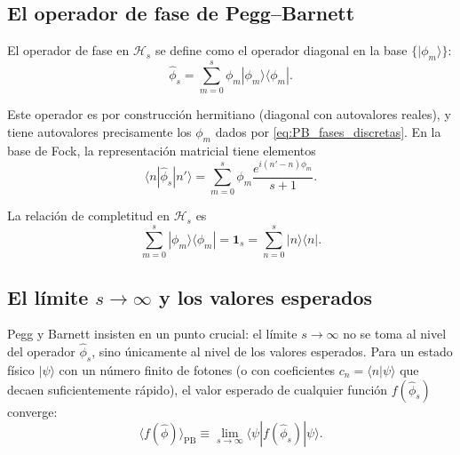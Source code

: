         \subsection{El operador de fase de Pegg--Barnett}
        
            El operador de fase en $\mathcal{H}_s$ se define como el operador diagonal en la base $\{|\phi_m\rangle\}$:
            \begin{equation}
                \hat{\phi}_s = \sum_{m=0}^{s} \phi_m |\phi_m\rangle\langle\phi_m|.
                \label{eq:PB_operador}
            \end{equation}
            
            Este operador es por construcción hermitiano (diagonal con autovalores reales), y tiene autovalores precisamente los $\phi_m$ dados por \eqref{eq:PB_fases_discretas}. En la base de Fock, la representación matricial tiene elementos
            \begin{equation}
                \langle n|\hat{\phi}_s|n'\rangle = \sum_{m=0}^{s} \phi_m \frac{e^{i(n'-n)\phi_m}}{s+1}.
                \label{eq:PB_matriz}
            \end{equation}
            
            La relación de completitud en $\mathcal{H}_s$ es
            \begin{equation}
                \sum_{m=0}^{s}|\phi_m\rangle\langle\phi_m| = \mathbf{1}_s = \sum_{n=0}^{s}|n\rangle\langle n|.
            \end{equation}
 
        \subsection{El límite $s \to \infty$ y los valores esperados}
        
            Pegg y Barnett insisten en un punto crucial: el límite $s \to \infty$ no se toma al nivel del operador $\hat{\phi}_s$, sino únicamente al nivel de los valores esperados. Para un estado físico $|\psi\rangle$ con un número finito de fotones (o con coeficientes $c_n = \langle n|\psi\rangle$ que decaen suficientemente rápido), el valor esperado de cualquier función $f(\hat{\phi}_s)$ converge:
            \begin{equation}
                \langle f(\hat{\phi})\rangle_{\text{PB}} \equiv \lim_{s\to\infty} \langle\psi|f(\hat{\phi}_s)|\psi\rangle.
                \label{eq:PB_limite}
            \end{equation}
            
